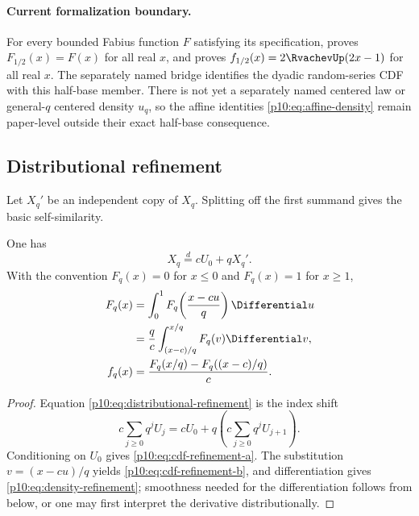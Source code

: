 \documentclass[11pt]{article}
\numberwithin{equation}{section}
\theoremstyle{definition}
\theoremstyle{remark}
\begin{document}
\paragraph{Current formalization boundary.}
For every bounded Fabius function \(F\) satisfying its specification,
 proves
\(F_{1/2}(x)=F(x)\) for all real \(x\), and
 proves
\(f_{1/2}(x)=2\RvachevUp(2x-1)\) for all real \(x\).  The separately named bridge
 identifies the dyadic random-series
CDF with this half-base member.  There is not yet a separately named centered law or
general-\(q\) centered density \(u_q\), so the affine identities
\eqref{p10:eq:affine-density} remain paper-level outside their exact half-base consequence.

\subsection{Distributional refinement}

Let $X_q'$ be an independent copy of $X_q$.  Splitting off the first summand gives the basic
self-similarity.

\begin{proposition}
\label{p10:prop:refinement}
One has
\begin{equation}
 X_q\overset d=cU_0+qX_q'.                  \label{p10:eq:distributional-refinement}
\end{equation}
With the convention $F_q(x)=0$ for $x\le0$ and $F_q(x)=1$ for $x\ge1$,
\begin{align}
 F_q(x)
 &=\int_0^1 F_q\!\left(\frac{x-cu}{q}\right)\Differential u            \label{p10:eq:cdf-refinement-a}\\
 &=\frac{q}{c}\int_{(x-c)/q}^{x/q}F_q(v)\Differential v,               \label{p10:eq:cdf-refinement-b}\\
 f_q(x)
 &=\frac{F_q(x/q)-F_q((x-c)/q)}{c}.                            \label{p10:eq:density-refinement}
\end{align}
\end{proposition}

\begin{proof}
Equation \eqref{p10:eq:distributional-refinement} is the index shift
\[
 c\sum_{j\ge0}q^jU_j=cU_0+q\left(c\sum_{j\ge0}q^jU_{j+1}\right).
\]
Conditioning on $U_0$ gives \eqref{p10:eq:cdf-refinement-a}.  The substitution
$v=(x-cu)/q$ yields \eqref{p10:eq:cdf-refinement-b}, and differentiation gives
\eqref{p10:eq:density-refinement}; smoothness needed for the differentiation follows from
 below, or one may first interpret the derivative distributionally.
\end{proof}
\end{document}
